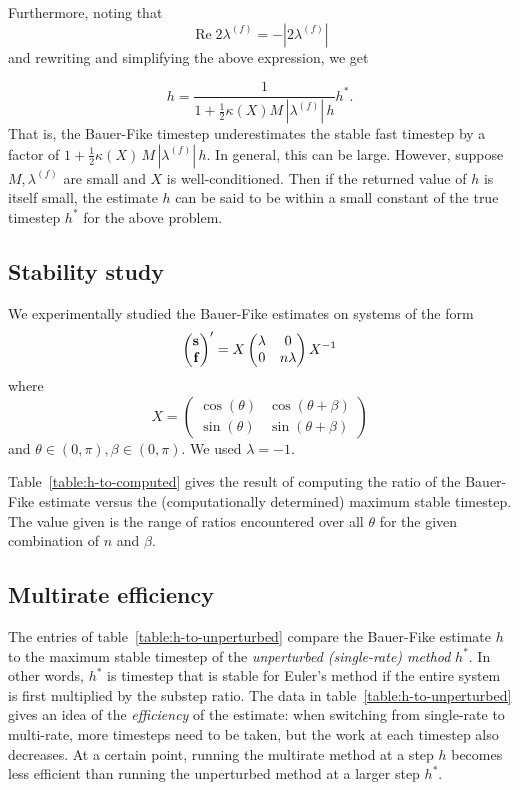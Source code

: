 \documentclass[10pt]{article}
\renewcommand{\Re}{\mathop{\textrm{Re}}}
\begin{document}
Furthermore, noting that
%
\[ \Re 2 \lambda^{(f)} = - | 2 \lambda^{(f)} | \]
%
and rewriting and simplifying the above expression, we get

%
\[ h = \frac{1}{1 + \frac{1}{2} \kappa(X) M \, |\lambda^{(f)}| \, h} h^*. \]
%
That is, the Bauer-Fike timestep underestimates the stable fast timestep
by a factor of $1 + \frac{1}{2} \kappa(X) \, M \, |\lambda^{(f)}| \, h$.
 In general, this can
be large. However, suppose $M, \lambda^{(f)}$ are small and $X$ is
well-conditioned. Then if the returned value of $h$ is itself small, the
estimate $h$ can be said to be within a small constant of the true
timestep $h^*$ for the above problem.

\subsection*{Stability study}

We experimentally studied the Bauer-Fike estimates on systems of the
form
%
\[ \begin{pmatrix} \mathbf{s}_{} \\ \mathbf{f}_{} \end{pmatrix}' = X \begin{pmatrix} \lambda & 0 \\
  0 & n \lambda \end{pmatrix} X^{-1} \]
%
where
%
\[ X = \begin{pmatrix} \cos(\theta) & \cos(\theta + \beta) \\
       \sin(\theta) & \sin(\theta + \beta) \end{pmatrix} \]
%
and $\theta \in (0, \pi), \beta \in (0, \pi)$. We used $\lambda = -1$.

Table~\ref{table:h-to-computed} gives the result of computing the ratio
of the Bauer-Fike estimate versus the (computationally determined)
maximum stable timestep. The value given is the range of ratios
encountered over all $\theta$ for the given combination of $n$ and
$\beta$.

\subsection*{Multirate efficiency}

The entries of table~\ref{table:h-to-unperturbed} compare the Bauer-Fike
estimate $h$ to the maximum stable timestep of the \emph{unperturbed
  (single-rate) method} $h^*$. In other words, $h^*$ is timestep that is
stable for Euler's method if the entire system is first multiplied by
the substep ratio. The data in table~\ref{table:h-to-unperturbed} gives
an idea of the \emph{efficiency} of the estimate: when switching from
single-rate to multi-rate, more timesteps need to be taken, but the work
at each timestep also decreases. At a certain point, running the
multirate method at a step $h$ becomes less efficient than running the
unperturbed method at a larger step $h^*$.
\end{document}
